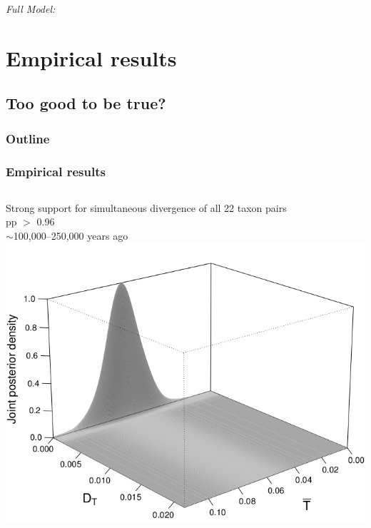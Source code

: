 \begin{frame}[t]
\begin{onlyenv}
\begin{block}{\it Full Model:}
    \end{block}
    \end{onlyenv}
\end{frame}

\section{Empirical results}
\subsection{Too good to be true?}

\begin{frame}
\frametitle{Outline}
\end{frame}

\begin{frame}
    \frametitle{Empirical results}
    \begin{columns}[c]
            {\small
            Strong support for simultaneous divergence of all 22 taxon pairs \\
            \vspace{1cm}
            pp $>$ 0.96 \\
            \vspace{1cm}
            $\sim$100,000--250,000 years ago}
        \includegraphics[width=\textwidth]{images/jointDensityPlotsSlide.jpg}
    \end{columns}
\end{frame}

